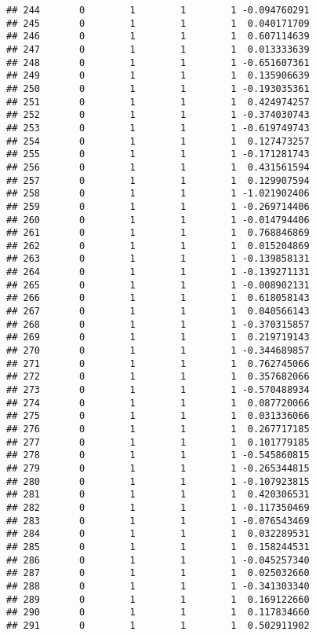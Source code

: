 \documentclass[]{book}
\theoremstyle{definition}
\theoremstyle{definition}
\theoremstyle{definition}
\theoremstyle{remark}
\begin{document}
\begin{verbatim}
## 244       0        1        1        1 -0.094760291
## 245       0        1        1        1  0.040171709
## 246       0        1        1        1  0.607114639
## 247       0        1        1        1  0.013333639
## 248       0        1        1        1 -0.651607361
## 249       0        1        1        1  0.135906639
## 250       0        1        1        1 -0.193035361
## 251       0        1        1        1  0.424974257
## 252       0        1        1        1 -0.374030743
## 253       0        1        1        1 -0.619749743
## 254       0        1        1        1  0.127473257
## 255       0        1        1        1 -0.171281743
## 256       0        1        1        1  0.431561594
## 257       0        1        1        1  0.129907594
## 258       0        1        1        1 -1.021902406
## 259       0        1        1        1 -0.269714406
## 260       0        1        1        1 -0.014794406
## 261       0        1        1        1  0.768846869
## 262       0        1        1        1  0.015204869
## 263       0        1        1        1 -0.139858131
## 264       0        1        1        1 -0.139271131
## 265       0        1        1        1 -0.008902131
## 266       0        1        1        1  0.618058143
## 267       0        1        1        1  0.040566143
## 268       0        1        1        1 -0.370315857
## 269       0        1        1        1  0.219719143
## 270       0        1        1        1 -0.344689857
## 271       0        1        1        1  0.762745066
## 272       0        1        1        1  0.357682066
## 273       0        1        1        1 -0.570488934
## 274       0        1        1        1  0.087720066
## 275       0        1        1        1  0.031336066
## 276       0        1        1        1  0.267717185
## 277       0        1        1        1  0.101779185
## 278       0        1        1        1 -0.545860815
## 279       0        1        1        1 -0.265344815
## 280       0        1        1        1 -0.107923815
## 281       0        1        1        1  0.420306531
## 282       0        1        1        1 -0.117350469
## 283       0        1        1        1 -0.076543469
## 284       0        1        1        1  0.032289531
## 285       0        1        1        1  0.158244531
## 286       0        1        1        1 -0.045257340
## 287       0        1        1        1  0.025032660
## 288       0        1        1        1 -0.341303340
## 289       0        1        1        1  0.169122660
## 290       0        1        1        1  0.117834660
## 291       0        1        1        1  0.502911902

\end{verbatim}
\end{document}
